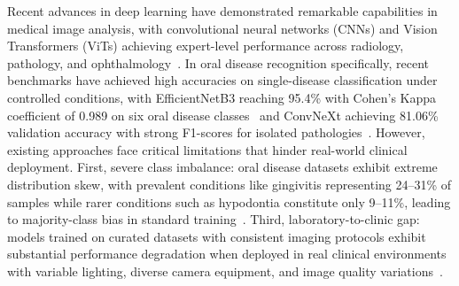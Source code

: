 Recent advances in deep learning have demonstrated remarkable capabilities in medical image analysis, with convolutional neural networks (CNNs) and Vision Transformers (ViTs) achieving expert-level performance across radiology, pathology, and ophthalmology~\cite{george2025deep}. In oral disease recognition specifically, recent benchmarks have achieved high accuracies on single-disease classification under controlled conditions, with EfficientNetB3 reaching 95.4\% with Cohen's Kappa coefficient of 0.989 on six oral disease classes~\cite{ali2025interpretable} and ConvNeXt achieving 81.06\% validation accuracy with strong F1-scores for isolated pathologies~\cite{george2025deep}. However, existing approaches face critical limitations that hinder real-world clinical deployment. First, severe class imbalance: oral disease datasets exhibit extreme distribution skew, with prevalent conditions like gingivitis representing 24--31\% of samples while rarer conditions such as hypodontia constitute only 9--11\%, leading to majority-class bias in standard training~\cite{george2025deep,wang2024mosaic}. 
Third, laboratory-to-clinic gap: models trained on curated datasets with consistent imaging protocols exhibit substantial performance degradation when deployed in real clinical environments with variable lighting, diverse camera equipment, and image quality variations~\cite{araujo2025twostep,canali2022challenges}.


